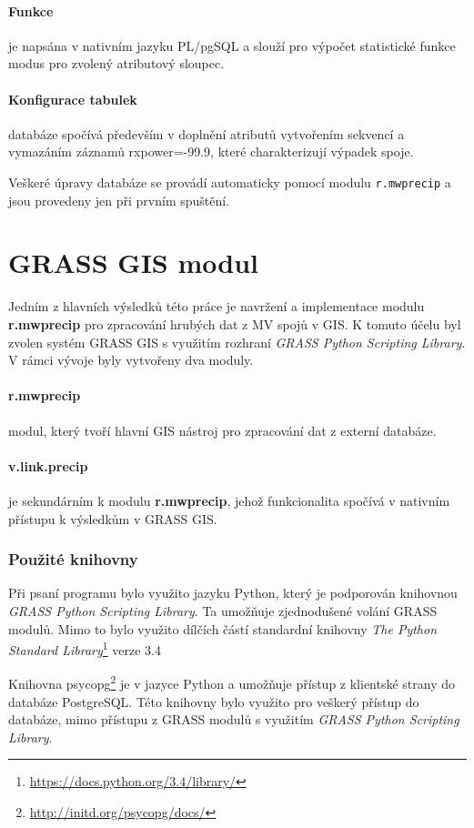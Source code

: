 \documentclass[a4paper,12pt]{report}
\begin{document}
\paragraph*{Funkce} je napsána v nativním jazyku PL/pgSQL a slouží pro výpočet statistické funkce modus pro zvolený atributový sloupec. 

\paragraph*{Konfigurace tabulek} databáze spočívá především v doplnění atributů vytvořením sekvencí a vymazáním záznamů rxpower=-99.9, které charakterizují výpadek spoje. 

\bigskip

Veškeré úpravy databáze se provádí automaticky pomocí modulu \texttt{r.mwprecip} a jsou provedeny jen při prvním spuštění. 
\section{GRASS GIS modul}
Jedním z hlavních výsledků této práce je navržení a implementace modulu \textbf{r.mwprecip} pro zpracování hrubých dat z MV spojů v GIS. K tomuto účelu byl zvolen systém GRASS GIS s využitím rozhraní \textit{GRASS Python Scripting Library}. V rámci vývoje byly vytvořeny dva moduly.

\paragraph*{r.mwprecip}  modul, který tvoří hlavní GIS nástroj pro zpracování dat z externí databáze.
\paragraph*{v.link.precip} je sekundárním  k modulu  \textbf{r.mwprecip}, jehož funkcionalita spočívá v nativním přístupu k výsledkům   v GRASS GIS.  

\subsubsection{Použité knihovny}
Při psaní programu bylo využito jazyku Python, který je podporován knihovnou  \textit{GRASS Python Scripting Library}\cite{spygrass}. Ta umožňuje zjednodušené volání GRASS modulů. Mimo to bylo využito dílčích částí standardní knihovny \textit{The Python Standard Library}\footnote{\url{https://docs.python.org/3.4/library/}} verze 3.4

Knihovna psycopg\footnote{\url{http://initd.org/psycopg/docs/}} je v jazyce Python a  umožňuje přístup z klientské strany do databáze PostgreSQL. Této knihovny bylo využito pro veškerý přístup do databáze, mimo přístupu z GRASS modulů s využitím \textit{GRASS Python Scripting Library}.
\end{document}
